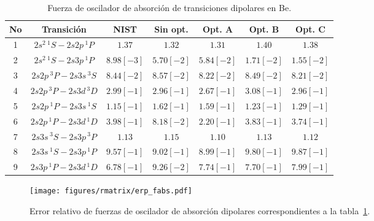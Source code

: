 \begin{table}
\begin{adjustwidth}{-.6in}{-.6in}  
\centering
\begin{tabular}{|*{7}{c|}} 
\hline 
No & Transición &
NIST &
Sin opt.   & Opt. A    & Opt. B  & Opt. C\\
\hline
\hline
1  & $2s^2  \,^1S - 2s2p \,^1P$ & 
$1.37$ &
$1.32    $ & $1.31    $ & $1.40    $ & $1.38$ \\
2  & $2s^2  \,^1S - 2s3p \,^1P$ & 
$8.98[-3]$ &
$5.70[-2]$ & $5.84[-2]$ & $1.71[-2]$ & $1.55[-2]$ \\
3  & $2s2p \,^3P - 2s3s \,^3S$ & 
$8.44[-2]$ &
$8.57[-2]$ & $8.22[-2]$ & $8.49[-2]$ & $8.21[-2]$ \\
4  & $2s2p \,^3P - 2s3d \,^3D$ & 
$2.99[-1]$ &
$2.96[-1]$ & $2.67[-1]$ & $3.08[-1]$ & $2.96[-1]$ \\
5  & $2s2p \,^1P - 2s3s \,^1S$ & 
$1.15[-1]$ &
$1.62[-1]$ & $1.59[-1]$ & $1.23[-1]$ & $1.29[-1]$ \\
6  & $2s2p \,^1P - 2s3d \,^1D$ & 
$3.98[-1]$ &
$8.18[-2]$ & $2.20[-1]$ & $3.83[-1]$ & $3.74[-1]$ \\
7  & $2s3s \,^3S - 2s3p \,^3P$ & 
$1.13$ &
$1.15    $ & $1.10$     & $1.13    $ & $1.12$ \\
8  & $2s3s \,^1S - 2s3p \,^1P$ & 
$9.57[-1]$ &
$9.02[-1]$ & $8.99[-1]$ & $9.80[-1]$ & $9.87[-1]$ \\
9 & $2s3p \,^1P - 2s3d \,^1D$ & 
$6.78[-1]$ &
$9.26[-2]$ & $7.74[-1]$ & $7.70[-1]$ & $7.99[-1]$ \\
\hline
\end{tabular}
\caption{Fuerza de oscilador de absorción de transiciones dipolares en 
Be.}
\label{tab:fabs}
\end{adjustwidth}
\end{table}
\begin{figure}
\centering
\texttt{[image: figures/rmatrix/erp\_fabs.pdf]} 
\caption{Error relativo de fuerzas de oscilador de absorción dipolares 
correspondientes a la tabla~\ref{tab:fabs}.}
\label{fig:fabs}
\end{figure}

